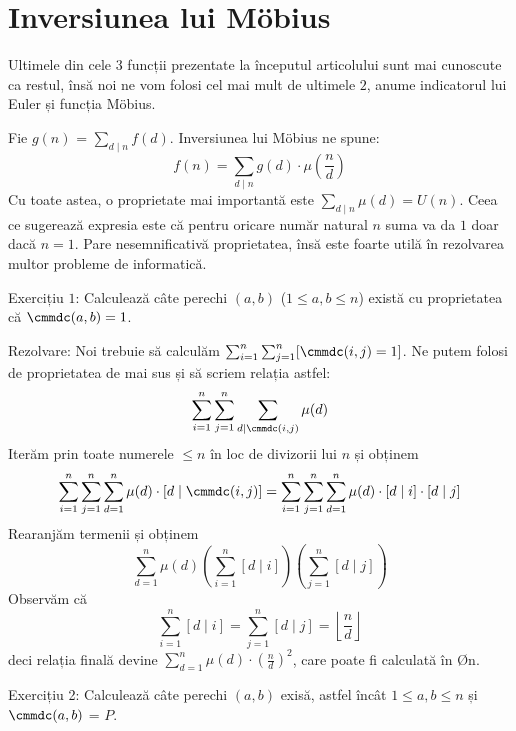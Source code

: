 \section{Inversiunea lui Möbius}
Ultimele din cele $3$ funcții prezentate la începutul articolului sunt mai cunoscute ca restul, însă noi ne vom folosi cel mai mult de ultimele $2$, anume indicatorul lui Euler și funcția Möbius.

Fie $g(n)$ = $\sum_{d\mid n} f(d)$. Inversiunea lui Möbius ne spune:
\begin{equation*}
    f(n) = \sum_{d\mid n} g(d) \cdot \mu \left(\frac{n}{d}\right)
\end{equation*}
Cu toate astea, o proprietate mai importantă este $\sum_{d\mid n} \mu(d) = U(n)$. Ceea ce sugerează expresia este că pentru oricare număr natural $n$ suma va da $1$ doar dacă $n = 1$. Pare nesemnificativă proprietatea, însă este foarte utilă în rezolvarea multor probleme de informatică.

Exercițiu $1$: Calculează câte perechi $(a,b)$ ($1 \leq a,b \leq n$) există cu proprietatea că $\cmmdc(a,b) = 1$.

Rezolvare: Noi trebuie să calculăm $\sum_{i=1}^{n} \sum_{j=1}^{n} [\cmmdc(i, j) = 1]$. Ne putem folosi de proprietatea de mai sus și să scriem relația astfel: 
\begin{equation*}
    \sum_{i=1}^{n} \sum_{j=1}^{n} \sum_{d \mid  \cmmdc(i,j)} \mu(d)
\end{equation*}
Iterăm prin toate numerele $\leq n$ în loc de divizorii lui $n$ și obținem 
\begin{equation*}
    \sum_{i=1}^{n} \sum_{j=1}^{n} \sum_{d = 1}^{n} \mu(d) \cdot [d\mid \cmmdc(i,j)] = \sum_{i=1}^{n} \sum_{j=1}^{n} \sum_{d = 1}^{n} \mu(d) \cdot [d\mid i] \cdot [d\mid j]
\end{equation*}
Rearanjăm termenii și obținem
\begin{equation*}
    \sum_{d=1}^{n} \mu(d) \left(\sum_{i=1}^{n} [d\mid i]\right) \left(\sum_{j=1}^{n} [d\mid j]\right)
\end{equation*}
Observăm că \begin{equation*}
    \sum_{i=1}^{n} [d\mid i] = \sum_{j=1}^{n} [d\mid j] = \left\lfloor \frac{n}{d} \right\rfloor
\end{equation*} deci relația finală devine $\sum_{d=1}^{n} \mu(d) \cdot (\frac{n}{d})^2$, care poate fi calculată în \O{n}.

Exercițiu 2: Calculează câte perechi $(a,b)$ exisă, astfel încât $1 \leq a,b \leq n$ și $\cmmdc(a, b)$ = $P$.

